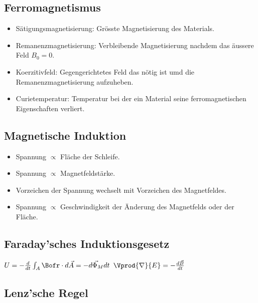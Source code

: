 \documentclass[10pt,a4paper]{scrartcl}
\begin{document}
\begin{multicols*}{3}
\begin{tabulary}{\linewidth}{L|L|L}
	\end{tabulary}
	
	\subsection*{Ferromagnetismus}
	
	\begin{itemize}
	\compaq
	\item
	Sätigungsmagnetisierung: Grösste Magnetisierung des Materials.
	\item
	Remanenzmagnetisierung: Verbleibende Magnetisierung nachdem das äussere Feld $B_0=0$.
	\item
	Koerzitivfeld: Gegengerichtetes Feld das nötig ist umd die Remanenzmagnetisierung aufzuheben. 
	\item
	Curietemperatur: Temperatur bei der ein Material seine ferromagnetischen Eigenschaften verliert.
	\end{itemize}
	 
	\subsection{Magnetische Induktion}
	\begin{itemize}
	\compaq
	\item
	Spannung $\propto$ Fläche der Schleife.
	\item
	Spannung $\propto$ Magnetfeldstärke.
	\item
	Vorzeichen der Spannung wechselt mit Vorzeichen des Magnetfeldes.
	\item
	Spannung $\propto$ Geschwindigkeit der Änderung des Magnetfelds oder der Fläche.
	\end{itemize}
	
	\subsection{Faraday'sches Induktionsgesetz}
	$U=-\frac{d}{dt}\int_A{\Bofr\cdot d\vec{A}=-\vec{d\Phi_M}{dt}}$ \hfill $\Vprod{\nabla}{E}=-\frac{d\vec{B}}{dt}$
	
	\subsection{Lenz'sche Regel}
	

\end{multicols*}
\end{document}
